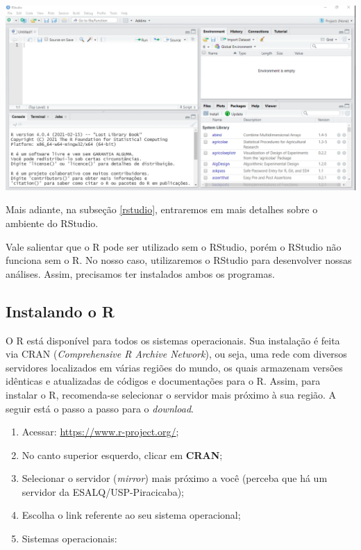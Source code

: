 \documentclass[
  brazilian,
]{book}
\let\origfigure\figure
\let\endorigfigure\endfigure
\renewenvironment{figure}[1][2] {
    \expandafter\origfigure\expandafter[H]
} {
    \endorigfigure
}
\begin{document}
\begin{figure}

{\centering \includegraphics[width=0.7\linewidth]{imagens/rstudio_tela} 

}

\caption{Tela do RStudio. Como podemos perceber, bem diferente do R original.}\label{fig:rstudio-apresenta}
\end{figure}

Mais adiante, na subseção \ref{rstudio}, entraremos em mais detalhes sobre o ambiente do RStudio.

Vale salientar que o R pode ser utilizado sem o RStudio, porém o RStudio não funciona sem o R. No nosso caso, utilizaremos o RStudio para desenvolver nossas análises. Assim, precisamos ter instalados ambos os programas.

\hypertarget{instalando-o-r}{%
\subsection{Instalando o R}\label{instalando-o-r}}

O R está disponível para todos os sistemas operacionais. Sua instalação é feita via CRAN (\emph{Comprehensive R Archive Network}), ou seja, uma rede com diversos servidores localizados em várias regiões do mundo, os quais armazenam versões idênticas e atualizadas de códigos e documentações para o R. Assim, para instalar o R, recomenda-se selecionar o servidor mais próximo à sua região. A seguir está o passo a passo para o \emph{download}.

\begin{enumerate}
\def\labelenumi{\arabic{enumi}.}
\item
  Acessar: \url{https://www.r-project.org/};
\item
  No canto superior esquerdo, clicar em \textbf{CRAN};
\item
  Selecionar o servidor (\emph{mirror}) mais próximo a você (perceba que há um servidor da ESALQ/USP-Piracicaba);
\item
  Escolha o link referente ao seu sistema operacional;
\item
  Sistemas operacionais:
\end{enumerate}
\end{document}
